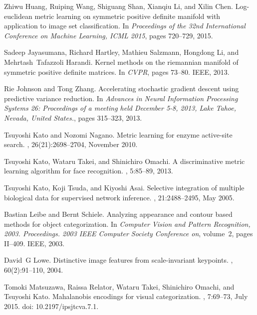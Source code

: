 \documentclass[10pt,onecolumn]{article}
\theoremstyle{definition}
\theoremstyle{definition}
\theoremstyle{definition}
\theoremstyle{definition}
\theoremstyle{definition}
\theoremstyle{theorem}
\newcommand{\0}{{\bm{0}}}
\newcommand{\1}{{\bm{1}}}
\begin{document}
\begin{thebibliography}{10}
Zhiwu Huang, Ruiping Wang, Shiguang Shan, Xianqiu Li, and Xilin Chen.
\newblock Log-euclidean metric learning on symmetric positive definite manifold
  with application to image set classification.
\newblock In {\em Proceedings of the 32nd International Conference on Machine
  Learning, {ICML} 2015}, pages 720--729, 2015.

Sadeep Jayasumana, Richard Hartley, Mathieu Salzmann, Hongdong Li, and
  Mehrtash~Tafazzoli Harandi.
\newblock Kernel methods on the riemannian manifold of symmetric positive
  definite matrices.
\newblock In {\em CVPR}, pages 73--80. IEEE, 2013.

Rie Johnson and Tong Zhang.
\newblock Accelerating stochastic gradient descent using predictive variance
  reduction.
\newblock In {\em Advances in Neural Information Processing Systems 26:
  Proceedings of a meeting held December 5-8, 2013, Lake Tahoe, Nevada, United
  States.}, pages 315--323, 2013.

Tsuyoshi Kato and Nozomi Nagano.
\newblock Metric learning for enzyme active-site search.
, 26(21):2698--2704, November 2010.

Tsuyoshi Kato, Wataru Takei, and Shinichiro Omachi.
\newblock A discriminative metric learning algorithm for face recognition.
,
  5:85--89, 2013.

Tsuyoshi Kato, Koji Tsuda, and Kiyoshi Asai.
\newblock Selective integration of multiple biological data for supervised
  network inference.
, 21:2488--2495, May 2005.

Bastian Leibe and Bernt Schiele.
\newblock Analyzing appearance and contour based methods for object
  categorization.
\newblock In {\em Computer Vision and Pattern Recognition, 2003. Proceedings.
  2003 IEEE Computer Society Conference on}, volume~2, pages II--409. IEEE,
  2003.

David~G Lowe.
\newblock Distinctive image features from scale-invariant keypoints.
, 60(2):91--110, 2004.

Tomoki Matsuzawa, Raissa Relator, Wataru Takei, Shinichiro Omachi, and Tsuyoshi
  Kato.
\newblock Mahalanobis encodings for visual categorization.
,
  7:69--73, July 2015.
\newblock doi: 10.2197/ipsjtcva.7.1.


\end{thebibliography}
\end{document}
